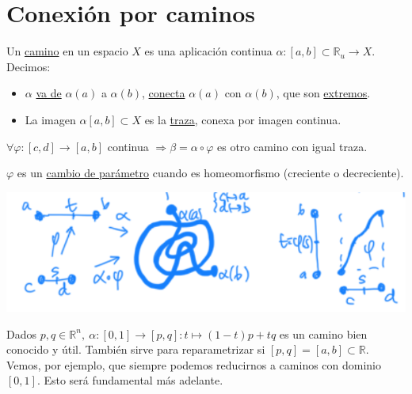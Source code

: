 \chapter{Conexión por caminos}%
\label{cha:conexion_por_caminos}
\begin{defi}
Un \underline{camino} en un espacio $X$ es una aplicación continua $\alpha: \left[ a, b \right] \subset \mathbb{R}_u \rightarrow X$. Decimos:
\begin{itemize}
    \item $\alpha$ \underline{va de} $\alpha\left( a \right)$ a $\alpha\left( b \right)$, \underline{conecta} $\alpha\left( a \right)$ con $\alpha\left( b \right)$, que son \underline{extremos}.
    \item La imagen $\alpha\left[ a, b \right] \subset X$ es la \underline{traza}, conexa por imagen continua.
\end{itemize}
\end{defi}

\begin{prop}
$\forall \varphi: \left[ c, d \right] \rightarrow \left[ a, b \right]$ continua $\Rightarrow \beta = \alpha \circ \varphi$ es otro camino con igual traza.    

$\varphi$ es un \underline{cambio de parámetro} cuando es homeomorfismo (creciente o decreciente).
\begin{center}
    \includegraphics[scale=0.3]{images/camb_par_caminos} 
\end{center}
\end{prop}

\begin{ej}
Dados $p, q \in \mathbb{R}^n,\ \alpha : \left[ 0, 1 \right] \rightarrow \left[ p, q \right]: t \mapsto \left( 1 - t \right) p + tq$ es un camino bien conocido y útil. También sirve para reparametrizar si $\left[ p, q \right] = \left[ a, b \right] \subset \mathbb{R}$. Vemos, por ejemplo, que siempre podemos reducirnos a caminos con dominio $\left[ 0, 1 \right]$. Esto será fundamental más adelante. 
\end{ej}

